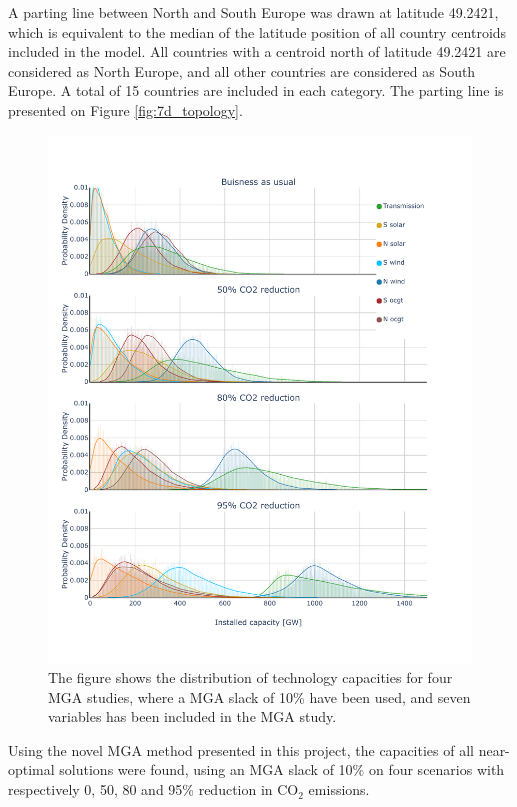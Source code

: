 A parting line between North and South Europe was drawn at latitude 49.2421, which is equivalent to the median of the latitude position of all country centroids included in the model. All countries with a centroid north of latitude 49.2421 are considered as North Europe, and all other countries are considered as South Europe. A total of 15 countries are included in each category. The parting line is presented on Figure \ref{fig:7d_topology}. 

\begin{figure}[p]\centerfloat
	\includegraphics[width=1.3\textwidth,trim={0 1.7cm 0 0cm},clip]{./Images/7D_study_histogram}
	\caption{The figure shows the distribution of technology capacities for four MGA studies, where a MGA slack of 10\% have been used, and seven variables has been included in the MGA study. }
	\label{fig:7d_hist}
\end{figure}

Using the novel MGA method presented in this project, the capacities of all near-optimal solutions were found, using an MGA slack of 10\% on four scenarios with respectively 0, 50, 80 and 95\% reduction in $\text{CO}_2$ emissions. 

